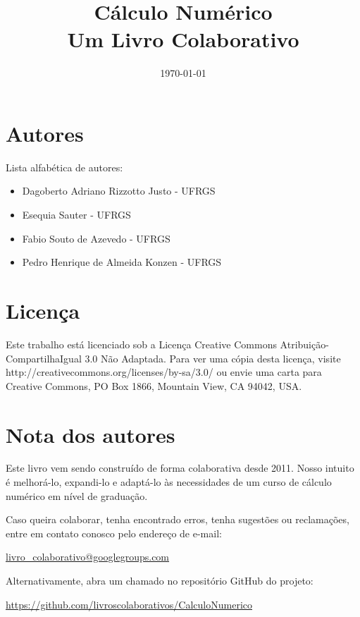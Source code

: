 \documentclass[12pt]{book}
\begin{document}
\frontmatter

\title{Cálculo Numérico\\\small{Um Livro Colaborativo}}
\author{}
\date{\today}

\AddToShipoutPicture*{\BackgroundPic}
\maketitle


\chapter*{Autores}

Lista alfabética de autores:
\begin{itemize}
\item[] Dagoberto Adriano Rizzotto Justo - UFRGS
\item[] Esequia Sauter - UFRGS
\item[] Fabio Souto de Azevedo - UFRGS
\item[] Pedro Henrique de Almeida Konzen - UFRGS
\end{itemize}

\chapter*{Licença}

Este trabalho está licenciado sob a Licença Creative Commons Atribuição-CompartilhaIgual 3.0 Não Adaptada. Para ver uma cópia desta licença, visite http://creativecommons.org/licenses/by-sa/3.0/ ou envie uma carta para Creative Commons, PO Box 1866, Mountain View, CA 94042, USA.
 
\chapter*{Nota dos autores}

Este livro vem sendo construído de forma colaborativa desde 2011. Nosso intuito é melhorá-lo, expandi-lo e adaptá-lo às necessidades de um curso de cálculo numérico em nível de graduação.

Caso queira colaborar, tenha encontrado erros, tenha sugestões ou reclamações, entre em contato conosco pelo endereço de e-mail:
\begin{center}
\url{livro_colaborativo@googlegroups.com}  
\end{center}
Alternativamente, abra um chamado no repositório GitHub do projeto:
\begin{center}
\url{https://github.com/livroscolaborativos/CalculoNumerico}  
\end{center}
\end{document}
